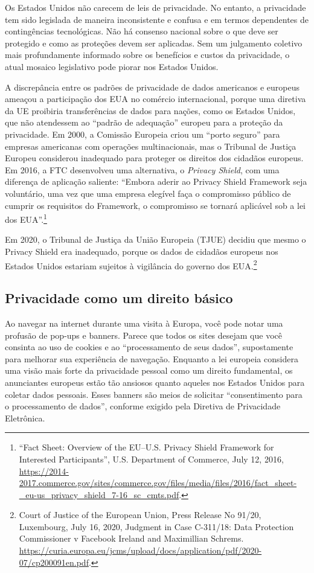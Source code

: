 \documentclass{book}
\newcommand{\ingles}[1]{\textit{#1}}
\begin{document}
Os Estados Unidos não carecem de leis de privacidade. No entanto, a privacidade
tem sido legislada de maneira inconsistente e confusa e em termos dependentes
de contingências tecnológicas. Não há consenso nacional sobre o que deve ser
protegido e como as proteções devem ser aplicadas. Sem um julgamento coletivo
mais profundamente informado sobre os benefícios e custos da privacidade, o
atual mosaico legislativo pode piorar nos Estados Unidos.

A discrepância entre os padrões de privacidade de dados americanos e europeus
ameaçou a participação dos EUA no comércio internacional, porque uma diretiva
da UE proibiria transferências de dados para nações, como os Estados Unidos,
que não atendessem ao ``padrão de adequação'' europeu para a proteção da
privacidade. Em 2000, a Comissão Europeia criou um ``porto seguro'' para
empresas americanas com operações multinacionais, mas o Tribunal de Justiça
Europeu considerou inadequado para proteger os direitos dos cidadãos europeus.
Em 2016, a FTC desenvolveu uma alternativa, o \ingles{Privacy Shield}, com uma
diferença de aplicação saliente: ``Embora aderir ao Privacy Shield Framework
seja voluntário, uma vez que uma empresa elegível faça o compromisso público
de cumprir os requisitos do Framework, o compromisso se tornará aplicável sob
a lei dos EUA''.\footnote{``Fact Sheet: Overview of the EU–U.S. Privacy Shield
Framework for Interested Participants'', U.S. Department of Commerce, July 12, 2016,
\url{https://2014-2017.commerce.gov/sites/commerce.gov/files/media/files/2016/fact_sheet-_eu-us_privacy_shield_7-16_sc_cmts.pdf}.}

Em 2020, o Tribunal de Justiça da União Europeia (TJUE) decidiu que mesmo o
Privacy Shield era inadequado, porque os dados de cidadãos europeus nos Estados
Unidos estariam sujeitos à vigilância do governo dos EUA.\footnote{Court of
Justice of the European Union, Press Release No 91/20, Luxembourg, July 16,
2020, Judgment in Case C-311/18: Data Protection Commissioner v Facebook
Ireland and Maximillian Schrems. 
\url{https://curia.europa.eu/jcms/upload/docs/application/pdf/2020-07/cp200091en.pdf}.}

\subsection{Privacidade como um direito básico}
\label{cap3:quem-principios-basico}
Ao navegar na internet durante uma visita à Europa, você pode notar uma profusão
de pop-ups e banners. Parece que todos os sites desejam que você consinta ao uso
de cookies e ao ``processamento de seus dados'', supostamente para melhorar sua
experiência de navegação. Enquanto a lei europeia considera uma visão mais forte
da privacidade pessoal como um direito fundamental, os anunciantes europeus estão
tão ansiosos quanto aqueles nos Estados Unidos para coletar dados pessoais. Esses
banners são meios de solicitar ``consentimento para o processamento de dados'',
conforme exigido pela Diretiva de Privacidade Eletrônica.
\end{document}
